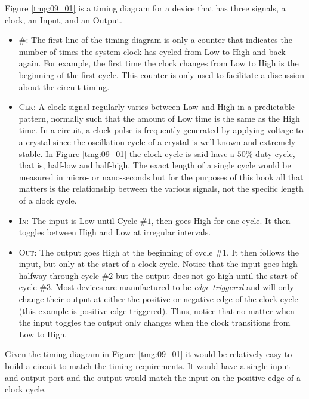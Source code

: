 Figure \ref{tmg:09_01} is a timing diagram for a device that has three signals, a clock, an Input, and an Output. 

\begin{itemize}

  \item \textsc{\#}: The first line of the timing diagram is only a counter that indicates the number of times the system clock has cycled from Low to High and back again. For example, the first time the clock changes from Low to High is the beginning of the first cycle. This counter is only used to facilitate a discussion about the circuit timing. 

  \item \textsc{Clk}: A clock signal regularly varies between Low and High in a predictable pattern, normally such that the amount of Low time is the same as the High time. In a circuit, a clock pulse is frequently generated by applying voltage to a crystal since the oscillation cycle of a crystal is well known and extremely stable. In Figure \ref{tmg:09_01} the clock cycle is said have a $ 50 $\% duty cycle, that is, half-low and half-high. The exact length of a single cycle would be measured in micro- or nano-seconds but for the purposes of this book all that matters is the relationship between the various signals, not the specific length of a clock cycle.
  
  \item \textsc{In}: The input is Low until Cycle \#$ 1 $, then goes High for one cycle. It then toggles between High and Low at irregular intervals.
  
  \item \textsc{Out}: The output goes High at the beginning of cycle \#$ 1 $. It then follows the input, but only at the start of a clock cycle. Notice that the input goes high halfway through cycle \#$ 2 $ but the output does not go high until the start of cycle \#$ 3 $. Most devices are manufactured to be \emph{edge triggered} and will only change their output at either the positive or negative edge of the clock cycle (this example is positive edge triggered). Thus, notice that no matter when the input toggles the output only changes when the clock transitions from Low to High.

\end{itemize}

Given the timing diagram in Figure \ref{tmg:09_01} it would be relatively easy to build a circuit to match the timing requirements. It would have a single input and output port and the output would match the input on the positive edge of a clock cycle.

